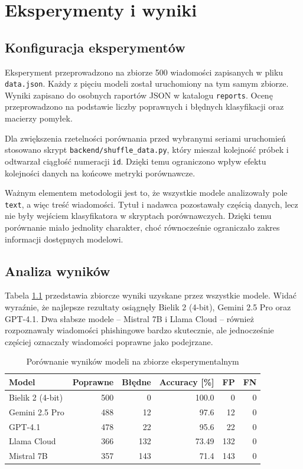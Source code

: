 \documentclass[12pt,a4paper,openany]{report}
\begin{document}
\chapter{Eksperymenty i wyniki}

\section{Konfiguracja eksperymentów}

Eksperyment przeprowadzono na zbiorze 500 wiadomości zapisanych w pliku \texttt{data.json}. Każdy z pięciu modeli został uruchomiony na tym samym zbiorze. Wyniki zapisano do osobnych raportów JSON w katalogu \texttt{reports}. Ocenę przeprowadzono na podstawie liczby poprawnych i błędnych klasyfikacji oraz macierzy pomyłek.

Dla zwiększenia rzetelności porównania przed wybranymi seriami uruchomień stosowano skrypt \texttt{backend/shuffle\_data.py}, który mieszał kolejność próbek i odtwarzał ciągłość numeracji \texttt{id}. Dzięki temu ograniczono wpływ efektu kolejności danych na końcowe metryki porównawcze.

Ważnym elementem metodologii jest to, że wszystkie modele analizowały pole \texttt{text}, a więc treść wiadomości. Tytuł i nadawca pozostawały częścią danych, lecz nie były wejściem klasyfikatora w skryptach porównawczych. Dzięki temu porównanie miało jednolity charakter, choć równocześnie ograniczało zakres informacji dostępnych modelowi.

\section{Analiza wyników}

Tabela \ref{tab:model-results} przedstawia zbiorcze wyniki uzyskane przez wszystkie modele. Widać wyraźnie, że najlepsze rezultaty osiągnęły Bielik 2 (4-bit), Gemini 2.5 Pro oraz GPT-4.1. Dwa słabsze modele -- Mistral 7B i Llama Cloud -- również rozpoznawały wiadomości phishingowe bardzo skutecznie, ale jednocześnie częściej oznaczały wiadomości poprawne jako podejrzane.

\begin{table}[H]
    \centering
    \small
    \begin{tabular}{l r r r r r}
        \toprule
        Model & Poprawne & Błędne & Accuracy [\%] & FP & FN \\
        \midrule
        Bielik 2 (4-bit) & 500 & 0 & 100.0 & 0 & 0 \\
        Gemini 2.5 Pro & 488 & 12 & 97.6 & 12 & 0 \\
        GPT-4.1 & 478 & 22 & 95.6 & 22 & 0 \\
        Llama Cloud & 366 & 132 & 73.49 & 132 & 0 \\
        Mistral 7B & 357 & 143 & 71.4 & 143 & 0 \\
        \bottomrule
    \end{tabular}
    \caption{Porównanie wyników modeli na zbiorze eksperymentalnym}
    \label{tab:model-results}
\end{table}
\end{document}
